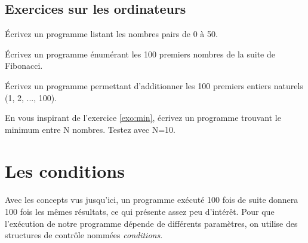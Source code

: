 \documentclass[11pt, a4paper]{book}
\begin{document}



\subsection{Exercices sur les ordinateurs}

\begin{exercice}
Écrivez un programme listant les nombres pairs de 0 à 50.
\end{exercice}

\begin{exercice}
Écrivez un programme énumérant les 100 premiers nombres de la suite de Fibonacci.
\end{exercice}

\begin{exercice}
Écrivez un programme permettant d'additionner les 100 premiers entiers naturels (1, 2, ..., 100). %
\end{exercice}

\begin{exercice}
En vous inspirant de l'exercice \ref{exo:min}, écrivez un programme trouvant le minimum entre N nombres.
Testez avec N=10.
\end{exercice}


\newpage

\section{Les conditions}

\paragraph{} Avec les concepts vus jusqu'ici, un programme exécuté 100 fois de suite donnera 100 fois les mêmes résultats, ce qui présente assez peu d'intérêt. Pour que l'exécution de notre programme dépende de différents paramètres, on utilise des structures de contrôle nommées \textit{conditions}.
\end{document}
